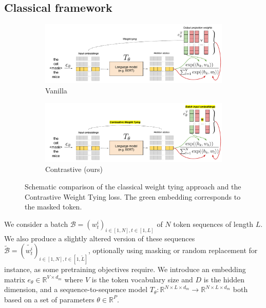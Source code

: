 \subsection{Classical framework}
\label{sec:cwt}
\begin{figure}[h]
    \centering
    \begin{subfigure}[b]{0.7\linewidth}
         \includegraphics[width=\linewidth]{sources/part_2/headless/imgs/weight_tying.pdf}
         \caption{Vanilla}
         \label{fig:comparison_schema_wt}
    \end{subfigure}
    \begin{subfigure}[b]{0.7\linewidth}
         \includegraphics[width=\linewidth]{sources/part_2/headless/imgs/contrastive_weight_tying.pdf}
         \caption{Contrastive (ours)}
         \label{fig:comparison_schema_cwt}
    \end{subfigure}
    \caption{Schematic comparison of the classical weight tying approach and the Contrastive Weight Tying loss. The green embedding corresponds to the masked token.}
    \label{fig:comparison_schema}
\end{figure}

We consider a batch $\mathcal{B} = (w^i_t)_{i \in [1, N], t \in [1,L]}$ of $N$ token sequences of length $L$. We also produce a slightly altered version of these sequences $\tilde{\mathcal{B}} = (\tilde{w^i_t})_{i \in [1, N], t \in [1,\tilde{L}]}$, optionally using masking or random replacement for instance, as some pretraining objectives require. We introduce an embedding matrix $e_\theta \in \mathbb{R}^{V \times d_m}$ where $V$ is the token vocabulary size and $D$ is the hidden dimension, and a sequence-to-sequence model $T_\theta: \mathbb{R}^{N\times L\times d_m} \rightarrow \mathbb{R}^{N\times L\times d_m}$ both based on a set of parameters $\theta \in \mathbb{R}^P$.

